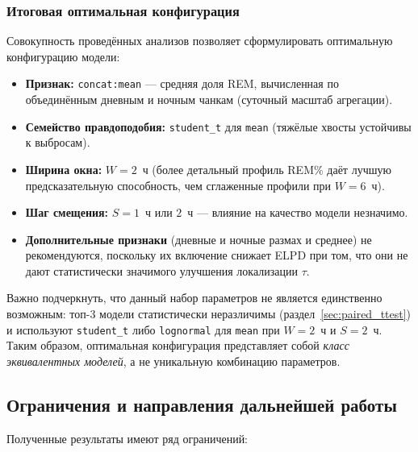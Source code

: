 \documentclass[14pt]{mmcs_article}
\begin{document}
	\subsubsection*{Итоговая оптимальная конфигурация}
	
	Совокупность проведённых анализов позволяет сформулировать
	оптимальную конфигурацию модели:
	
	\begin{itemize}
		\item \textbf{Признак:} \texttt{concat:mean} — средняя доля
		REM, вычисленная по объединённым дневным и ночным
		чанкам (суточный масштаб агрегации).
		\item \textbf{Семейство правдоподобия:}
		\texttt{student\_t} для \texttt{mean} (тяжёлые
		хвосты устойчивы к выбросам).
		\item \textbf{Ширина окна:} $W = 2$~ч (более детальный
		профиль REM\% даёт лучшую предсказательную
		способность, чем сглаженные профили при $W = 6$~ч).
		\item \textbf{Шаг смещения:} $S = 1$~ч или $2$~ч —
		влияние на качество модели незначимо.
		\item \textbf{Дополнительные признаки} (дневные и ночные размах и среднее) не рекомендуются,
		поскольку их включение снижает ELPD при том, что
		они не дают статистически значимого улучшения
		локализации $\tau$.
	\end{itemize}
	
	Важно подчеркнуть, что данный набор параметров не является
	единственно возможным: топ-3 модели статистически
	неразличимы (раздел~\ref{sec:paired_ttest}) и используют
	\texttt{student\_t} либо \texttt{lognormal} для
	\texttt{mean} при $W = 2$~ч и $S = 2$~ч. Таким образом,
	оптимальная конфигурация представляет собой \textit{класс
		эквивалентных моделей}, а не уникальную комбинацию
	параметров.
	
	\subsection*{Ограничения и направления дальнейшей работы}
	
	Полученные результаты имеют ряд ограничений:
	
\end{document}
